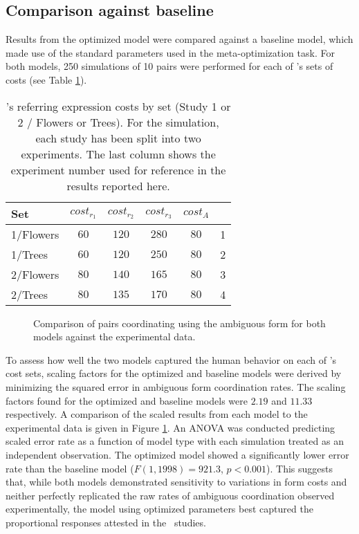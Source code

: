 \documentclass[a4paper,11pt]{article}
\begin{document}
\subsection{Comparison against baseline}
\label{sec:model_comparison}
Results from the optimized model were compared against a baseline model, which made use of the standard parameters used in the meta-optimization task. For both models, 250 simulations of 10 pairs were performed for each of \citeauthor{rohde2012}'s sets of costs (see Table \ref{table:2}).
\begin{table}[]
\begin{center}
    \begin{tabular}{l c c c c | c}
    Set & $cost_{r_1}$ & $cost_{r_2}$ & $cost_{r_3}$ & $cost_A$ & \\ \hline
    1/Flowers & $60$ & $120$ & $280$ & $80$ & 1\\ \hline
    1/Trees & $60$ & $120$ & $250$ & $80$ & 2\\ \hline
    2/Flowers & $80$ & $140$ & $165$ & $80$ & 3\\ \hline
    2/Trees & $80$ & $135$ & $170$ & $80$ & 4\\ 
    \end{tabular}
    \caption{\citeauthor{rohde2012}'s referring expression costs by set (Study 1 or 2 / Flowers or Trees). For the simulation, each study has  been split into two experiments. The last column shows the experiment number used for reference in the results reported here.}
    \label{table:2}
\end{center}
\end{table}

\begin{figure}
\centering
\scalebox{.55}{}
\caption{Comparison of pairs coordinating using the ambiguous form for both models against the experimental data.}
\label{fig:model_comp}
\end{figure}

To assess how well the two models captured the human behavior on each of \citeauthor{rohde2012}'s cost sets, scaling factors for the optimized and baseline models were derived by minimizing the squared error in ambiguous form coordination rates. The scaling factors found for the optimized and baseline models were $2.19$ and $11.33$ respectively. A comparison of the scaled results from each model to the experimental data is given in Figure \ref{fig:model_comp}. An ANOVA was conducted predicting scaled error rate as a function of model type with each simulation treated as an independent observation. The optimized model showed a significantly lower error rate than the baseline model ($F(1, 1998) = 921.3$, $p<0.001$). This suggests that, while both models demonstrated sensitivity to variations in form costs and neither perfectly replicated the raw rates of ambiguous coordination observed experimentally, the model using optimized parameters best captured the proportional responses attested in the \citeauthor{rohde2012}\ studies. 
\end{document}

